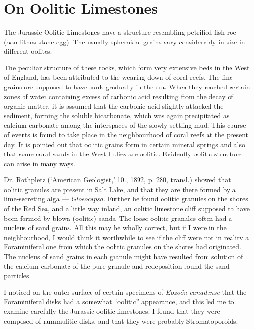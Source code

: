 \documentclass[a4paper, 12pt, oneside]{article}
\begin{document}
\section{On Oolitic Limestones}
\paragraph{}
The Jurassic Oolitic Limestones have a structure resembling petrified fish-roe (oon lithos stone egg). The usually spheroidal grains vary considerably in size in different oolites.

The peculiar structure of these rocks, which form very extensive beds in the West of England, has been attributed to the wearing down of coral reefs. The fine grains are supposed to have sunk gradually in the sea. When they reached certain zones of water containing excess of carbonic acid resulting from the decay of organic matter, it is assumed that the carbonic acid slightly attacked the sediment, forming the soluble bicarbonate, which was again precipitated as calcium carbonate among the interspaces of the slowly settling mud. This course of events is found to take place in the neighbourhood of coral reefs at the present day. It is pointed out that oolitic grains form in certain mineral springs and also that some coral sands in the West Indies are oolitic. Evidently oolitic structure can arise in many ways.

Dr. Rothpletz (`American Geologist,' 10., 1892, p. 280, transl.) showed that oolitic granules are present in Salt Lake, and that they are there formed by a lime-secreting alga --- \emph{Gloeocapsa}. Further he found oolitic granules on the shores of the Red Sea, and a little way inland, an oolitic limestone cliff supposed to have been formed by blown (oolitic) sands. The loose oolitic granules often had a nucleus of sand grains. All this may be wholly correct, but if I were in the neighbourhood, I would think it worthwhile to see if the cliff were not in reality a Foraminiferal one from which the oolitic granules on the shores had originated. The nucleus of sand grains in each granule might have resulted from solution of the calcium carbonate of the pure granule and redeposition round the sand particles.

I noticed on the outer surface of certain specimens of \emph{Eozoön canadense} that the Foraminiferal disks had a somewhat ``oolitic'' appearance, and this led me to examine carefully the Jurassic oolitic limestones. I found that they were composed of nummulitic disks, and that they were probably Stromatoporoids.
\end{document}
